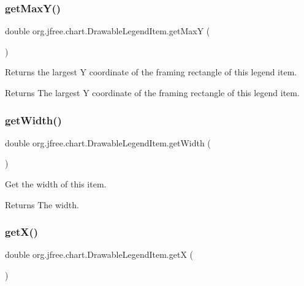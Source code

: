 \subsubsection{\texorpdfstring{get\+Max\+Y()}{getMaxY()}}
{\footnotesize\ttfamily double org.\+jfree.\+chart.\+Drawable\+Legend\+Item.\+get\+MaxY (\begin{DoxyParamCaption}{ }\end{DoxyParamCaption})}

Returns the largest Y coordinate of the framing rectangle of this legend item.

\begin{DoxyReturn}{Returns}
The largest Y coordinate of the framing rectangle of this legend item. 
\end{DoxyReturn}
\mbox{\label{classorg_1_1jfree_1_1chart_1_1_drawable_legend_item_a8ba5627ef06be6c4ac0548ff18880377}} 
\subsubsection{\texorpdfstring{get\+Width()}{getWidth()}}
{\footnotesize\ttfamily double org.\+jfree.\+chart.\+Drawable\+Legend\+Item.\+get\+Width (\begin{DoxyParamCaption}{ }\end{DoxyParamCaption})}

Get the width of this item.

\begin{DoxyReturn}{Returns}
The width. 
\end{DoxyReturn}
\mbox{\label{classorg_1_1jfree_1_1chart_1_1_drawable_legend_item_a79389bedf55b57549f11fc5078d1a04f}} 
\subsubsection{\texorpdfstring{get\+X()}{getX()}}
{\footnotesize\ttfamily double org.\+jfree.\+chart.\+Drawable\+Legend\+Item.\+getX (\begin{DoxyParamCaption}{ }\end{DoxyParamCaption})}


